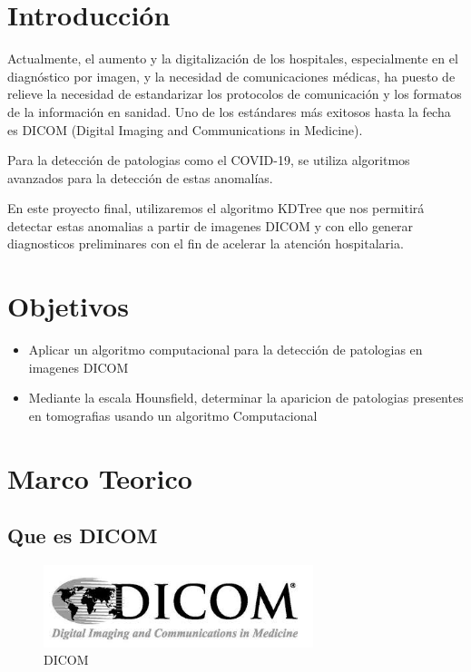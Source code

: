 \documentclass{article}
\begin{document}
	
		

\section{Introducción}
   Actualmente, el aumento y la  digitalización de los hospitales, especialmente en el diagnóstico  por imagen, y la necesidad de comunicaciones médicas, ha puesto de relieve la necesidad de estandarizar los protocolos de comunicación y los formatos de la información en sanidad. 
   Uno de los estándares más exitosos hasta la fecha es DICOM (Digital Imaging and Communications in Medicine). 
   
   Para la detección de patologias como el COVID-19, se utiliza algoritmos avanzados para la detección de estas anomalías. 
   
    En este proyecto final, utilizaremos el algoritmo KDTree que nos  permitirá detectar estas anomalias a partir de imagenes DICOM y con ello generar diagnosticos preliminares con el fin de acelerar la atención hospitalaria.

 \section{Objetivos}
 \begin{itemize}
	\item Aplicar un algoritmo computacional para la detección de patologias en imagenes DICOM
	\item Mediante la escala Hounsfield, determinar la aparicion de patologias presentes en tomografias usando un algoritmo Computacional
	\end{itemize}
	
\section{Marco Teorico}
\subsection{Que es DICOM}

\begin{figure}[H]
\centering
\includegraphics[width=0.7\textwidth]{img/dicom.jpg}
\caption{DICOM}
\end{figure}
\end{document}
